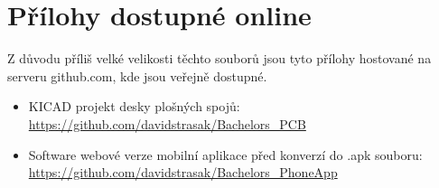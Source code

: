 \section*{Přílohy dostupné online}
Z důvodu příliš velké velikosti těchto souborů jsou tyto přílohy hostované na serveru github.com, kde jsou veřejně dostupné.
\begin{itemize}
	\item KICAD projekt desky plošných spojů: \url{https://github.com/davidstrasak/Bachelors_PCB}
	\item Software webové verze mobilní aplikace před konverzí do .apk souboru: \url{https://github.com/davidstrasak/Bachelors_PhoneApp}
\end{itemize}















